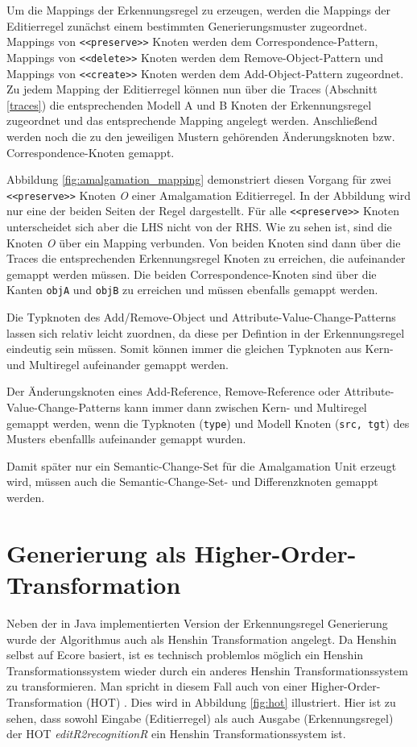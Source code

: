 Um die Mappings der Erkennungsregel zu erzeugen, werden die Mappings der Editierregel zunächst einem
bestimmten Generierungsmuster zugeordnet. Mappings von \texttt{<<preserve>>} Knoten werden dem
Correspondence-Pattern, Mappings von \texttt{<<delete>>} Knoten werden dem Remove-Object-Pattern und
Mappings von \texttt{<<create>>} Knoten werden dem Add-Object-Pattern zugeordnet. Zu jedem Mapping
der Editierregel können nun über die Traces (Abschnitt \ref{traces}) die entsprechenden Modell A und
B Knoten der Erkennungsregel zugeordnet und das entsprechende Mapping angelegt werden. Anschließend
werden noch die zu den jeweiligen Mustern gehörenden Änderungsknoten bzw.
Correspondence-Knoten gemappt.

Abbildung \ref{fig:amalgamation_mapping} demonstriert diesen Vorgang für zwei \texttt{<<preserve>>}
Knoten \textit{O} einer Amalgamation Editierregel. In der Abbildung wird nur eine der beiden Seiten
der Regel dargestellt. Für alle \texttt{<<preserve>>} Knoten unterscheidet sich aber die LHS nicht
von der RHS. Wie zu sehen ist, sind die Knoten \textit{O} über ein Mapping verbunden. Von beiden
Knoten sind dann über die Traces die entsprechenden Erkennungsregel Knoten zu erreichen, die
aufeinander gemappt werden müssen. Die beiden Correspondence-Knoten sind über die Kanten
\texttt{objA} und \texttt{objB} zu erreichen und müssen ebenfalls gemappt werden.

Die Typknoten des Add/Remove-Object und Attribute-Value-Change-Patterns lassen sich relativ leicht
zuordnen, da diese per Defintion in der Erkennungsregel eindeutig sein müssen. Somit können immer
die gleichen Typknoten aus Kern- und Multiregel aufeinander gemappt werden.

Der Änderungsknoten eines Add-Reference, Remove-Reference oder Attribute-Value-Change-Patterns kann
immer dann zwischen Kern- und Multiregel gemappt werden, wenn die Typknoten (\texttt{type}) und
Modell Knoten (\texttt{src, tgt}) des Musters ebenfallls aufeinander gemappt wurden.

Damit später nur ein Semantic-Change-Set für die Amalgamation Unit erzeugt wird, müssen auch
die Semantic-Change-Set- und Differenzknoten gemappt werden.

\section{Generierung als Higher-Order-Transformation}

Neben der in Java implementierten Version der Erkennungsregel Generierung wurde der Algorithmus
auch als Henshin Transformation angelegt. Da Henshin selbst auf Ecore basiert, ist es technisch
problemlos möglich ein Henshin Transformationssystem wieder durch ein anderes
Henshin Transformationssystem zu transformieren. Man spricht in diesem Fall auch von einer
Higher-Order-Transformation (HOT) \cite{TJF09}. Dies wird in Abbildung \ref{fig:hot} illustriert.
Hier ist zu sehen, dass sowohl Eingabe (Editierregel) als auch Ausgabe (Erkennungsregel) der HOT
\textit{editR2recognitionR} ein Henshin Transformationssystem ist.

